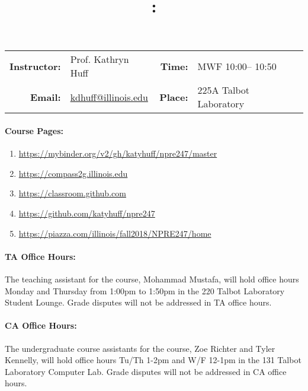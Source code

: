 \documentclass[11pt, a4paper]{article}
\title{\CourseNumber: \CourseTitle\\}
\author{\CourseUniversity}
\date{\CourseSemester \CourseYear}
\makeatletter
\newcommand{\CourseNumber}{NPRE247}
\newcommand{\CourseInstructor}{Prof. Kathryn Huff\xspace}%
\newcommand{\CourseDays}{MWF\xspace}%
\newcommand{\CourseStart}{10:00\xspace}%
\newcommand{\CourseEnd}{10:50\xspace}%
\newcommand{\CourseInstructorEmail}{kdhuff@illinois.edu}
\newcommand{\CourseRoom}{225A\xspace}%
\newcommand{\CourseBuilding}{Talbot Laboratory\xspace}%
\newcommand{\TeachingAssistant}{Mohammad Mustafa\xspace}%
\newcommand{\TAOfficeHourDays}{Monday and Thursday \xspace}%
\newcommand{\TAOfficeHourStart}{1:00pm\xspace}%
\newcommand{\TAOfficeHourEnd}{1:50pm\xspace}%
\newcommand{\TAOfficeHourPlace}{the 220 Talbot Laboratory Student Lounge\xspace}
\newcommand{\CourseAssistants}{Zoe Richter and Tyler Kennelly\xspace}%
\newcommand{\CAOfficeHours}{Tu/Th 1-2pm and W/F 12-1pm \xspace}%
\newcommand{\CAOfficeHourPlace}{the 131 Talbot Laboratory Computer Lab\xspace}
\makeatother
\begin{document}
\maketitle
\renewcommand{\arraystretch}{1.5}
\begin{center}
\begin{table}[h]
\begin{tabularx}{\textwidth}{rXrX}
\hline
\textbf{Instructor:} & \CourseInstructor & \textbf{Time:} & \CourseDays \CourseStart -- \CourseEnd \\
\textbf{Email:} &  \href{mailto:\CourseInstructorEmail}{\CourseInstructorEmail} & \textbf{Place:} & \CourseRoom \CourseBuilding\\
\hline
\end{tabularx}
\end{table}
\end{center}

\paragraph{Course Pages:}
\begin{enumerate}
        \item \url{https://mybinder.org/v2/gh/katyhuff/npre247/master}
        \item \url{https://compass2g.illinois.edu}
        \item \url{https://classroom.github.com}
        \item \url{https://github.com/katyhuff/npre247}
        \item \url{https://piazza.com/illinois/fall2018/\CourseNumber/home}
\end{enumerate}

\paragraph{TA Office Hours:} The teaching assistant for the course, 
\TeachingAssistant, will hold office hours \TAOfficeHourDays from 
\TAOfficeHourStart to \TAOfficeHourEnd in \TAOfficeHourPlace. 
Grade disputes will not be addressed in TA office hours. 

\paragraph{CA Office Hours:} The undergraduate course assistants for the course, 
\CourseAssistants, will hold office hours \CAOfficeHours in \CAOfficeHourPlace.
Grade disputes will not be addressed in CA office hours. 
\end{document}
